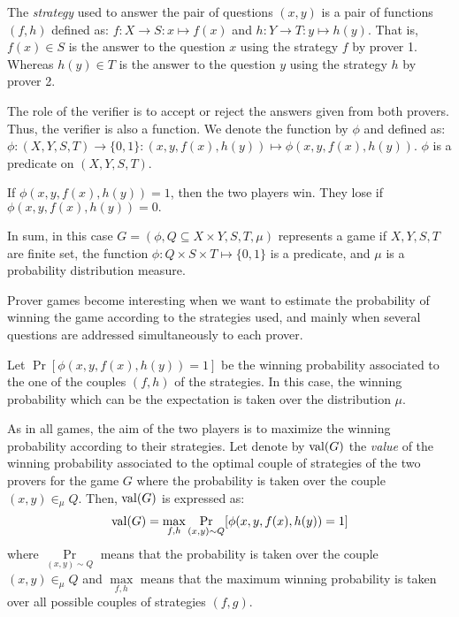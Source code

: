 The \textit{strategy} used to answer 
the pair of questions $(x,y)$
is a pair of functions $(f,h)$ defined as: $f: X \longrightarrow S: x \longmapsto f(x)$ and $h: Y \longrightarrow T: y \longmapsto h(y).$
That is, $f(x) \in S$ is the answer to the question $x$
using the strategy $f$ by prover 1. Whereas $h(y) \in T$ is the answer to the question $y$ using the strategy $h$ by prover 2.

The role of the verifier is to accept or reject the answers given from both provers. Thus, the verifier is also a function. We denote the function  
by $\phi$ and defined as: $\phi: (X,Y,S,T) \longrightarrow \{0,1\}: (x,y,f(x),h(y)) \longmapsto  \phi(x,y,f(x),h(y)).$ $\phi$ is a predicate on  $(X,Y,S,T).$

If $\phi(x,y,f(x),h(y))=1$, then the two players win. They lose if $\phi(x,y,f(x),h(y))=0.$ 

In sum, in this case $G=(\phi, Q\subseteq X \times Y, S,T, \mu)$ represents  a game if $X,Y,S,T$ are finite set,
the function $\phi: Q\times S \times T  \longmapsto \{0,1\}$ is a predicate, and $\mu$ is a probability distribution measure. 

Prover games become interesting when we want to estimate the probability of winning the game according to the strategies used, and mainly when several questions are addressed simultaneously  to each prover.

Let $\Pr[\phi(x,y,f(x),h(y))=1]$
be the winning probability associated to the one of the couples $(f,h)$ of the strategies. In this case, the winning probability \say{ $\Pr$} which can be the expectation is taken over the distribution $\mu.$

As in all games, the aim of the two players is to maximize the winning probability according to their strategies. Let denote by $\mathrm{val} (G)$ the \textit{value} of the winning probability associated to the optimal couple of strategies of the two provers for the game $G$ where the probability is taken over the couple $(x,y) \in_{\mu} Q$. Then, $\mathrm{val} (G)$ is expressed as: $$\mathrm{val} (G)=\max_{f,h}  \underset{(x,y) \sim Q}\Pr[\phi(x,y,f(x),h(y))=1]$$
where $\underset{(x,y) \sim Q}\Pr$ means that the probability is taken over the couple $(x,y) \in_{\mu} Q$ and $\max\limits_{f,h}$ means that the maximum winning probability  is taken over all possible couples of strategies $(f,g).$

